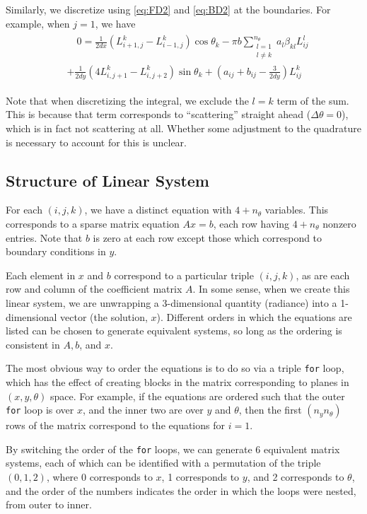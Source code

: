 \documentclass[10pt]{article}
\begin{document}
\begin{multicols}{2}
Similarly, we discretize using \eqref{eq:FD2} and \eqref{eq:BD2} at the boundaries.
For example, when $j=1$, we have
\begin{align}
    \label{eq:diffeq_bc}
    \begin{split}
    &\quad0 = \frac{1}{2dx}\left(L_{i+1,j}^k - L_{i-1,j}^k\right) \cos\theta_k
    - \pi b \sum_{\substack{l=1\\ l\neq k}}^{n_\theta} a_l\beta_{kl}L_{ij}^l \\
	&+ \frac{1}{2dy}\left(4L_{i,j+1}^k - L_{i,j+2}^k\right) \sin\theta_k
	+ (a_{ij} + b_{ij} -\frac{3}{2dy})L_{ij}^k
    \end{split}
\end{align}

Note that when discretizing the integral, we exclude the $l=k$ term of the sum.
This is because that term corresponds to ``scattering'' straight ahead ($\Delta\theta=0$), which is in fact not scattering at all.
Whether some adjustment to the quadrature is necessary to account for this is unclear.

\subsection{Structure of Linear System}
For each $(i,j,k)$, we have a distinct equation with $4+n_\theta$ variables.
This corresponds to a sparse matrix equation $Ax=b$, each row having $4+n_\theta$ nonzero entries.
Note that $b$ is zero at each row except those which correspond to boundary conditions in $y$.

Each element in $x$ and $b$ correspond to a particular triple $(i,j,k)$, as are each row and column of the coefficient matrix $A$.
In some sense, when we create this linear system, we are unwrapping a 3-dimensional quantity (radiance) into a 1-dimensional vector (the solution, $x$).
Different orders in which the equations are listed can be chosen to generate equivalent systems, so long as the ordering is consistent in $A,b$, and $x$.

The most obvious way to order the equations is to do so via a triple \texttt{for} loop, which has the effect of creating blocks in the matrix corresponding to planes in $(x,y,\theta)$ space.
For example, if the equations are ordered such that the outer \texttt{for} loop is over $x$, and the inner two are over $y$ and $\theta$, then the first $(n_y n_\theta)$ rows of the matrix correspond to the equations for $i=1$.

By switching the order of the \texttt{for} loops, we can generate 6 equivalent matrix systems, each of which can be identified with a permutation of the triple $(0,1,2)$, where 0 corresponds to $x$, 1 corresponds to $y$, and 2 corresponds to $\theta$, and the order of the numbers indicates the order in which the loops were nested, from outer to inner.


\end{multicols}
\end{document}
